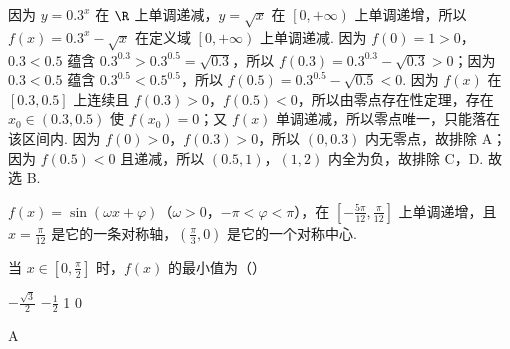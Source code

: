 \documentclass[UTF8,a4paper,oneside,11pt]{ctexbook}
\begin{document}
\begin{solution}
因为 \(y=0.3^{x}\) 在 \(\R\) 上单调递减，\(y=\sqrt{x}\) 在 \(\left[ 0,+\infty \right)\) 上单调递增，所以 \(f\left( x \right)=0.3^{x}-\sqrt{x}\) 在定义域 \(\left[ 0,+\infty \right)\) 上单调递减. 因为 \(f\left( 0 \right)=1>0\)，\(0.3<0.5\) 蕴含 \(0.3^{0.3}>0.3^{0.5}=\sqrt{0.3}\)，所以 \(f\left( 0.3 \right)=0.3^{0.3}-\sqrt{0.3}>0\)；因为 \(0.3<0.5\) 蕴含 \(0.3^{0.5}<0.5^{0.5}\)，所以 \(f\left( 0.5 \right)=0.3^{0.5}-\sqrt{0.5}<0\). 因为 \(f\left( x \right)\) 在 \(\left[ 0.3,0.5 \right]\) 上连续且 \(f\left( 0.3 \right)>0\)，\(f\left( 0.5 \right)<0\)，所以由零点存在性定理，存在 \(x_{0}\in\left( 0.3,0.5 \right)\) 使 \(f\left( x_{0} \right)=0\)；又 \(f\left( x \right)\) 单调递减，所以零点唯一，只能落在该区间内. 因为 \(f\left( 0 \right)>0\)，\(f\left( 0.3 \right)>0\)，所以 \(\left( 0,0.3 \right)\) 内无零点，故排除 A；因为 \(f\left( 0.5 \right)<0\) 且递减，所以 \(\left( 0.5,1 \right)\)，\(\left( 1,2 \right)\) 内全为负，故排除 C，D. 故选 B.
\end{solution}

\begin{problem}
\(f(x)=\sin(\omega x+\varphi)\)（\(\omega>0\)，\(-\pi<\varphi<\pi\)），在 \(\left[-\frac{5\pi}{12},\frac{\pi}{12}\right]\) 上单调递增，且 \(x=\frac{\pi}{12}\) 是它的一条对称轴，\((\frac{\pi}{3},0)\) 是它的一个对称中心.

当 \(x\in[0,\frac{\pi}{2}]\) 时，\(f(x)\) 的最小值为（\quad）

\choices
    {\(-\frac{\sqrt3}{2}\)}
    {\(-\frac12\)}
    {1}
    {0}
\end{problem}

\begin{answer}
A
\end{answer}
\end{document}
